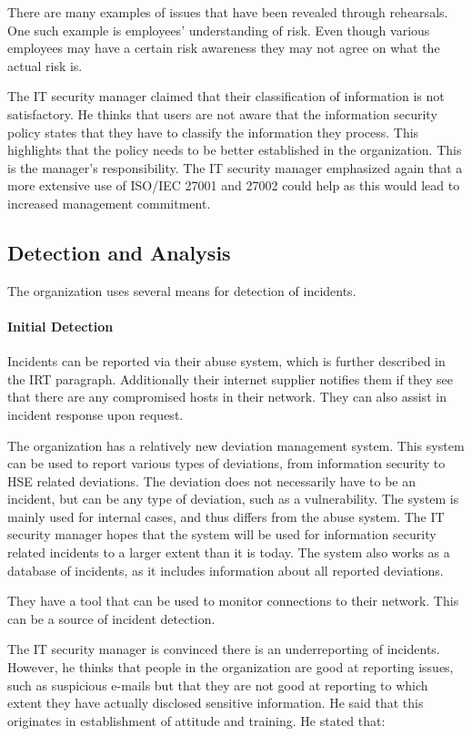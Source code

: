 \documentclass[b5paper, twoside, openright, 11pt]{report}
\begin{document}
There are many examples of issues that have been revealed through rehearsals. One such example is employees' understanding of risk. Even though various employees may have a certain risk awareness they may not agree on what the actual risk is. 

The IT security manager claimed that their classification of information is not satisfactory. He thinks that users are not aware that the information security policy states that they have to classify the information they process. This highlights that the policy needs to be better established in the organization. This is the manager's responsibility. The IT security manager emphasized again that a more extensive use of \acs{ISO}/\acs{IEC} 27001 and 27002 could help as this would lead to increased management commitment.

\subsection{Detection and Analysis}
The organization uses several means for detection of incidents.

\paragraph{Initial Detection}
Incidents can be reported via their abuse system, which is further described in the \ac{IRT} paragraph. Additionally their internet supplier notifies them if they see that there are any compromised hosts in their network. They can also assist in incident response upon request.

The organization has a relatively new deviation management system. This system can be used to report various types of deviations, from information security to \ac{HSE} related deviations. The deviation does not necessarily have to be an incident, but can be any type of deviation, such as a vulnerability. The system is mainly used for internal cases, and thus differs from the abuse system. The IT security manager hopes that the system will be used for information security related incidents to a larger extent than it is today. The system also works as a database of incidents, as it includes information about all reported deviations.  

They have a tool that can be used to monitor connections to their network. This can be a source of incident detection.

The IT security manager is convinced there is an underreporting of incidents. However, he thinks that people in the organization are good at reporting issues, such as suspicious e-mails but that they are not good at reporting to which extent they have actually disclosed sensitive information. He said that this originates in establishment of attitude and training. He stated that:
\end{document}
